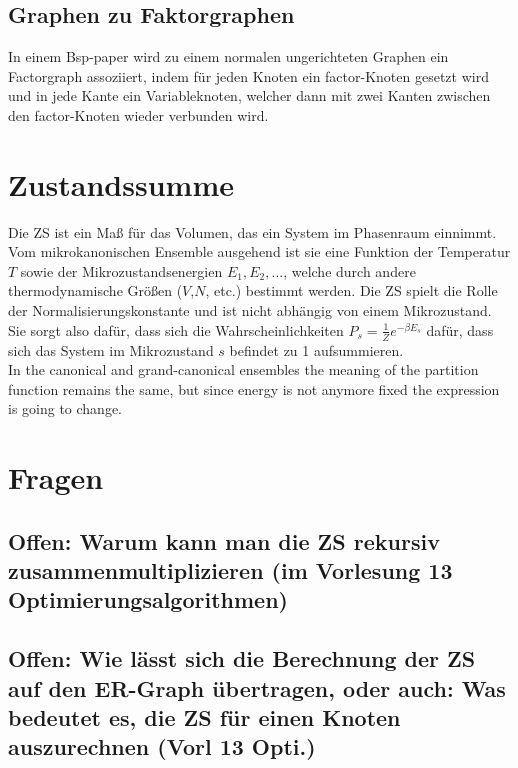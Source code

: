 \documentclass[paper=a4,10pt]{scrartcl}
\begin{document}
\subsection{Graphen zu Faktorgraphen}
In einem Bsp-paper wird zu einem normalen ungerichteten Graphen ein Factorgraph assoziiert, indem für jeden Knoten ein factor-Knoten gesetzt wird und in jede Kante ein Variableknoten, welcher dann mit zwei Kanten zwischen den factor-Knoten wieder verbunden wird. 

\section{Zustandssumme}
Die ZS ist ein Maß für das Volumen, das ein System im Phasenraum einnimmt.
Vom mikrokanonischen Ensemble ausgehend ist sie eine Funktion der Temperatur $T$ sowie der Mikrozustandsenergien $E_1, E_2, \dots$, welche durch andere thermodynamische Größen ($V$,$N$, etc.) bestimmt werden. Die ZS spielt die Rolle der Normalisierungskonstante und ist nicht abhängig von einem Mikrozustand. Sie sorgt also dafür, dass sich die Wahrscheinlichkeiten $P_s = \frac{1}{Z}e^{-\beta E_s}$ dafür, dass sich das System im Mikrozustand $s$ befindet zu 1 aufsummieren. \\
In the canonical and grand-canonical ensembles the meaning of the partition function remains the same, but since energy is not anymore fixed the expression is going to change.

\section{Fragen}
\subsection{Offen: Warum kann man die ZS rekursiv zusammenmultiplizieren (im Vorlesung 13 Optimierungsalgorithmen)}

\subsection{Offen: Wie lässt sich die Berechnung der ZS auf den ER-Graph übertragen, oder auch: Was bedeutet es, die ZS für einen Knoten auszurechnen (Vorl 13 Opti.)}
\end{document}

